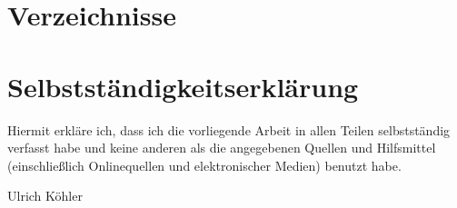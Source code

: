 \documentclass[ngerman,pdftex,paper=A4,DIV=calc,titlepage,12pt]{scrartcl}
\newtheorem[L]{boxedDefinition}{Definition}
\begin{document}
\section{Verzeichnisse}
\listoffigures
\renewcommand\refname{Literatur- und Quellenverzeichnis}


\clearpage
\section{Selbstständigkeitserklärung}
Hiermit erkläre ich, dass ich die vorliegende Arbeit in allen Teilen selbstständig verfasst habe und keine anderen als die angegebenen Quellen und Hilfsmittel (einschließlich Onlinequellen und elektronischer Medien) benutzt habe. 
\vfill
\begin{center}
\underline{\hspace{10cm}}\vspace{1cm}
\end{center}
\begin{center}
Ulrich Köhler
\end{center}
\vfill
\end{document}
